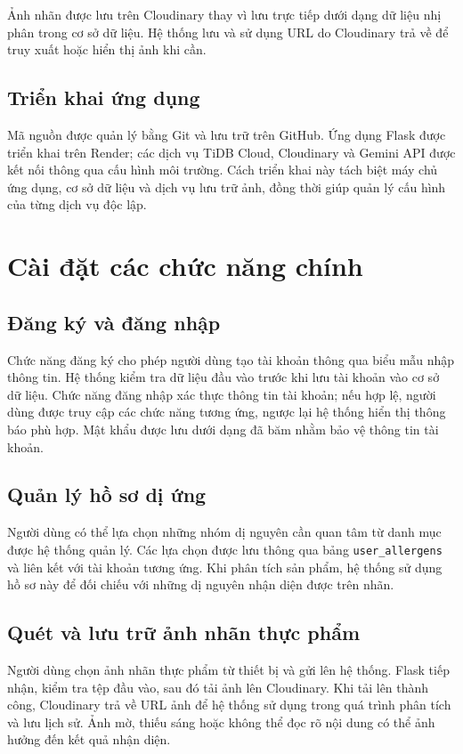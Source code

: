 Ảnh nhãn được lưu trên Cloudinary thay vì lưu trực tiếp dưới dạng dữ liệu nhị phân trong cơ sở dữ liệu. Hệ thống lưu và sử dụng URL do Cloudinary trả về để truy xuất hoặc hiển thị ảnh khi cần.

\subsection{Triển khai ứng dụng}

Mã nguồn được quản lý bằng Git và lưu trữ trên GitHub. Ứng dụng Flask được triển khai trên Render; các dịch vụ TiDB Cloud, Cloudinary và Gemini API được kết nối thông qua cấu hình môi trường. Cách triển khai này tách biệt máy chủ ứng dụng, cơ sở dữ liệu và dịch vụ lưu trữ ảnh, đồng thời giúp quản lý cấu hình của từng dịch vụ độc lập.

\section{Cài đặt các chức năng chính}

\subsection{Đăng ký và đăng nhập}

Chức năng đăng ký cho phép người dùng tạo tài khoản thông qua biểu mẫu nhập thông tin. Hệ thống kiểm tra dữ liệu đầu vào trước khi lưu tài khoản vào cơ sở dữ liệu. Chức năng đăng nhập xác thực thông tin tài khoản; nếu hợp lệ, người dùng được truy cập các chức năng tương ứng, ngược lại hệ thống hiển thị thông báo phù hợp. Mật khẩu được lưu dưới dạng đã băm nhằm bảo vệ thông tin tài khoản.

\subsection{Quản lý hồ sơ dị ứng}

Người dùng có thể lựa chọn những nhóm dị nguyên cần quan tâm từ danh mục được hệ thống quản lý. Các lựa chọn được lưu thông qua bảng \texttt{user\_allergens} và liên kết với tài khoản tương ứng. Khi phân tích sản phẩm, hệ thống sử dụng hồ sơ này để đối chiếu với những dị nguyên nhận diện được trên nhãn.

\subsection{Quét và lưu trữ ảnh nhãn thực phẩm}

Người dùng chọn ảnh nhãn thực phẩm từ thiết bị và gửi lên hệ thống. Flask tiếp nhận, kiểm tra tệp đầu vào, sau đó tải ảnh lên Cloudinary. Khi tải lên thành công, Cloudinary trả về URL ảnh để hệ thống sử dụng trong quá trình phân tích và lưu lịch sử. Ảnh mờ, thiếu sáng hoặc không thể đọc rõ nội dung có thể ảnh hưởng đến kết quả nhận diện.

